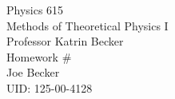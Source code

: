 \begin{titlepage}
\setlength{\topmargin}{1.5in}
\begin{center}
\Huge{Physics 615} \\
\LARGE{Methods of Theoretical Physics I} \\
\Large{Professor Katrin Becker} \\[1cm]

\huge{Homework \#\HWnum}\\[0.5cm]

\large{Joe Becker} \\
\large{UID: 125-00-4128} \\
\large{\due} 

\end{center}

\end{titlepage}

